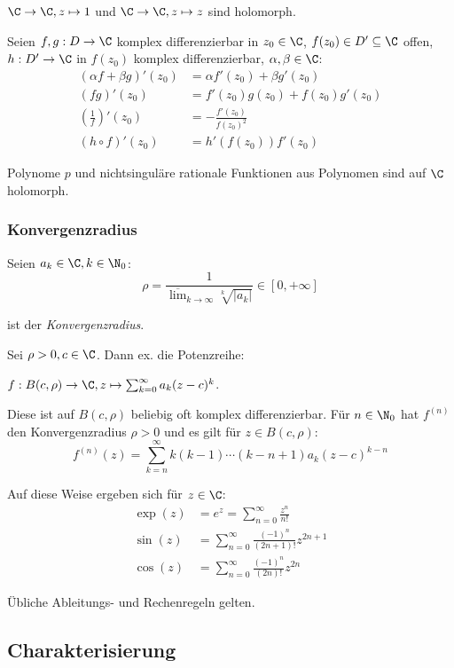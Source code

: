 \(\C \to \C, z \mapsto 1\) und \(\C \to \C, z \mapsto z\) sind holomorph.

Seien \(f, g : D \to \C\) komplex differenzierbar in \(z_0 \in \C\), \(f(z_0) \in D' \subseteq \C\) offen, \(h : D' \to \C\) in \(f(z_0)\) komplex differenzierbar, \(\alpha, \beta \in \C\):
\begin{align*}
	(\alpha f + \beta g)'(z_0) &= \alpha f'(z_0) + \beta g'(z_0) \\
	(fg)'(z_0) &= f'(z_0)g(z_0) + f(z_0)g'(z_0) \\
	\left(\frac{1}{f}\right)'(z_0) &= -\frac{f'(z_0)}{f(z_0)^2} \\
	(h \circ f)'(z_0) &= h'(f(z_0))f'(z_0)
\end{align*}

Polynome \(p\) und nichtsinguläre rationale Funktionen aus Polynomen sind auf \(\C\) holomorph.

\subsubsection*{Konvergenzradius}

Seien \(a_k \in \C, k \in \N_0\):
\[ \rho = \frac{1}{\overline\lim_{k\to\infty} \sqrt[k]{|a_k|}} \in [0,+\infty] \]

ist der \emph{Konvergenzradius}.

Sei \(\rho > 0, c \in \C\). Dann ex. die Potenzreihe:

	\(f : B(c,\rho) \to \C, z \mapsto \sum_{k=0}^\infty a_k(z-c)^k\).

Diese ist auf \(B(c,\rho)\) beliebig oft komplex differenzierbar. Für \(n \in \N_0\) hat \(f^{(n)}\) den Konvergenzradius \(\rho > 0\) und es gilt für \(z \in B(c,\rho)\):
\[ f^{(n)}(z) = \sum_{k=n}^\infty k(k-1)\cdots(k-n+1)a_k(z-c)^{k-n} \]

Auf diese Weise ergeben sich für \(z \in \C\):
\begin{align*}
	\exp(z) &= e^z = \sum_{n=0}^\infty \frac{z^n}{n!} \\
	\sin(z) &= \sum_{n=0}^\infty \frac{(-1)^n}{(2n+1)!} z^{2n+1} \\
	\cos(z) &= \sum_{n=0}^\infty \frac{(-1)^n}{(2n)!} z^{2n}
\end{align*}

Übliche Ableitungs- und Rechenregeln gelten.

\subsection*{Charakterisierung}

